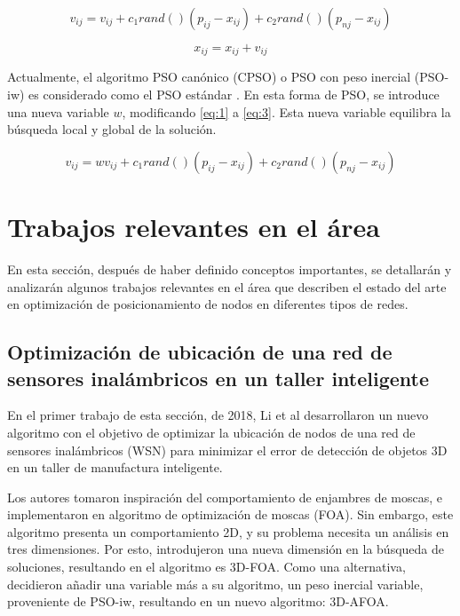   \begin{equation}
    \label{eq:1}
    v_{ij} = v_{ij} + c_1 rand()(p_{ij} - x_{ij}) + c_2 rand()(p_{nj} - x_{ij})
  \end{equation}

  \begin{equation}
    \label{eq:2}
    x_{ij} = x_{ij} + v_{ij}
  \end{equation}

  Actualmente, el algoritmo PSO canónico (CPSO) o PSO con peso inercial
  (PSO-iw) es considerado como el PSO estándar \cite{CPSO,PSOReview}.
  En esta forma de PSO, se introduce una nueva variable $w$, modificando
  \ref{eq:1} a \ref{eq:3}. Esta nueva variable equilibra la búsqueda local y
  global de la solución.

  \begin{equation}
    \label{eq:3}
    v_{ij} = w v_{ij} + c_1 rand()(p_{ij} - x_{ij}) + c_2 rand()(p_{nj} - x_{ij})
  \end{equation}

\section{Trabajos relevantes en el área}
En esta sección, después de haber definido conceptos importantes, se
detallarán y analizarán algunos trabajos relevantes en el área que describen
el estado del arte en optimización de posicionamiento de nodos en diferentes
tipos de redes.

\subsection{Optimización de ubicación de una red de sensores inalámbricos en
  un taller inteligente}
  En el primer trabajo de esta sección, de 2018, Li et al \cite{3DAFAO}
  desarrollaron un nuevo algoritmo con el
  objetivo de optimizar la ubicación de nodos de una red de sensores
  inalámbricos (WSN) para minimizar el error de detección de objetos 3D en un
  taller de manufactura inteligente.
  
  Los autores tomaron inspiración del comportamiento de enjambres de moscas,
  e implementaron en algoritmo de 
  optimización de moscas (FOA). Sin embargo, este algoritmo presenta un
  comportamiento 2D, y su problema necesita un análisis en tres dimensiones.
  Por esto, introdujeron una nueva dimensión en la búsqueda de soluciones,
  resultando en el algoritmo es 3D-FOA. Como una alternativa, decidieron
  añadir una variable más a su algoritmo, un peso inercial variable,
  proveniente de PSO-iw, resultando en un nuevo algoritmo: 3D-AFOA.

